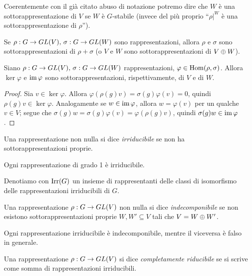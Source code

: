 Coerentemente con il già citato abuso di notazione potremo dire che $W$ è una sottorappresentazione di $V$ se $W$ è $G$-stabile (invece del più proprio ``$\rho|^W$ è una sottorappresentazione di $\rho$'').

\begin{example}
Se $\rho:G\to GL(V),\,\allowbreak\sigma:G\to GL(W)$ sono rappresentazioni, allora $\rho$ e $\sigma$ sono sottorappresentazioni di $\rho+\sigma$ (o $V$ e $W$ sono sottorappresentazioni di $V\oplus W$).
\end{example}

\begin{proposition}
Siano $\rho:G\to GL(V),\,\allowbreak\sigma:G\to GL(W)$ rappresentazioni, $\varphi\in\operatorname{Hom}(\rho,\sigma)$. Allora $\ker\varphi$ e $\operatorname{im}\varphi$ sono sottorappresentazioni, rispettivamente, di $V$ e di $W$.
\end{proposition}
\begin{proof}
Sia $v\in\ker\varphi$. Allora $\varphi(\rho(g)v)=\sigma(g)\varphi(v)=0$, quindi $\rho(g)v\in\ker\varphi$. Analogamente se $w\in\operatorname{im}\varphi$, allora $w=\varphi(v)$ per un qualche $v\in V$; segue che $\sigma(g)w=\sigma(g)\varphi(v)=\varphi(\rho(g)v)$, quindi $\sigma(g)w\in\operatorname{im}\varphi$.
\end{proof}

\begin{definition}
Una rappresentazione non nulla si dice \emph{irriducibile} se non ha sottorappresentazioni proprie.
\end{definition}

\begin{example}
Ogni rappresentazione di grado 1 è irriducibile.
\end{example}

Denotiamo con $\operatorname{Irr}(G)$ un insieme di rappresentanti delle classi di isomorfismo delle rappresentazioni irriducibili di $G$.

\begin{definition}
Una rappresentazione $\rho:G\to GL(V)$ non nulla si dice \emph{indecomponibile} se non esistono sottorappresentazioni proprie $W\comma W'\subseteq V$ tali che $V=W\oplus W'$.
\end{definition}

\begin{remark}
Ogni rappresentazione irriducibile è indecomponibile, mentre il viceversa è falso in generale.
\end{remark}

\begin{definition}
Una rappresentazione $\rho:G\to GL(V)$ si dice \emph{completamente riducibile} se si scrive come somma di rappresentazioni irriducibili.
\end{definition}

